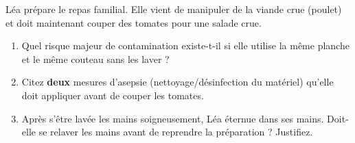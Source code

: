\documentclass[11pt]{article}
\begin{document}
\begin{exercice}
Léa prépare le repas familial. Elle vient de manipuler de la viande crue (poulet) et doit maintenant couper des tomates pour une salade crue.
\begin{enumerate}
    \item Quel risque majeur de contamination existe-t-il si elle utilise la même planche et le même couteau sans les laver ?
    \item Citez \textbf{deux} mesures d'asepsie (nettoyage/désinfection du matériel) qu'elle doit appliquer avant de couper les tomates.
    \item Après s'être lavée les mains soigneusement, Léa éternue dans ses mains. Doit-elle se relaver les mains avant de reprendre la préparation ? Justifiez.
\end{enumerate}
\end{exercice}
\end{document}
